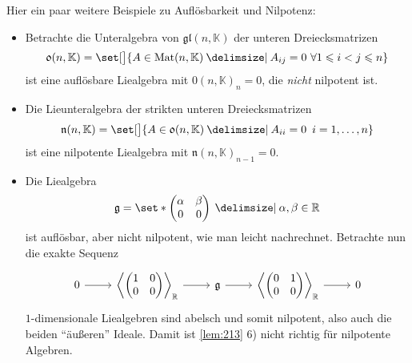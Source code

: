 \begin{beispiel*}[{name=[exakte Sequenzen und Auflösbarkeit]}]
	Hier ein paar weitere Beispiele zu Auflösbarkeit und Nilpotenz:
	\begin{itemize}[itemsep=1pt]
		\item Betrachte die Unteralgebra von $\mathfrak{gl}(n,\mathbb{K})$ der unteren Dreiecksmatrizen
		\[
			\mathfrak{0}(n,\mathbb{K}) = \set[\big]{A \in \Mat(n,\mathbb{K}) \given A_{ij}=0 \,\, \forall 1 \le i<j \le n}
		\]
		ist eine auflösbare Liealgebra mit $\mathfrak{0}(n,\mathbb{K})_n =0$, die \emph{nicht} nilpotent ist.
		\item Die Lieunteralgebra der strikten unteren Dreiecksmatrizen 
		\[
			\mathfrak{n}(n,\mathbb{K}) = \set[\big]{A \in \mathfrak{0}(n,\mathbb{K}) \given A_{ii}=0 \enspace i=1, \ldots ,n}
		\]
		ist eine nilpotente Liealgebra mit $\mathfrak{n}(n,\mathbb{K})_{n-1}=0$.
		\item Die Liealgebra 
		\[
			\mathfrak{g} = \set*{\begin{pmatrix}
				\alpha & \beta \\ 0 & 0
			\end{pmatrix} \given \alpha, \beta \in \mathbb{R}}
		\]
		ist auflösbar, aber nicht nilpotent, wie man leicht nachrechnet.
		Betrachte nun die exakte Sequenz
		\[
			\begin{tikzcd}[ampersand replacement=\&]
				0 \rar \& \lenbrace*{\begin{pmatrix}
					1 & 0 \\ 0 & 0
				\end{pmatrix}}_{\mathbb{R}} \rar \& \mathfrak{g} \rar \&
				\lenbrace*{\begin{pmatrix}
					0 & 1 \\ 0 & 0
				\end{pmatrix}}_{\mathbb{R}} \rar \& 0
			\end{tikzcd} 
		\]
		$1$-dimensionale Liealgebren sind abelsch und somit nilpotent, also auch die beiden \enquote{äußeren} Ideale.
		Damit ist \autoref{lem:213} 6) nicht richtig für nilpotente Algebren.
	\end{itemize}
\end{beispiel*}

